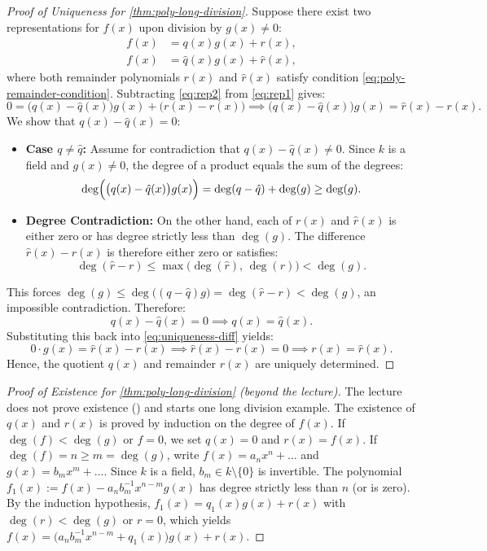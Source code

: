 \begin{content}
\begin{proof}[Proof of Uniqueness for \cref{thm:poly-long-division}]
Suppose there exist two representations for $f(x)$ upon division by $g(x) \neq 0$:
\begin{align}
f(x) &= q(x) g(x) + r(x), \label{eq:rep1} \\
f(x) &= \hat{q}(x) g(x) + \hat{r}(x), \label{eq:rep2}
\end{align}
where both remainder polynomials $r(x)$ and $\hat{r}(x)$ satisfy condition \eqref{eq:poly-remainder-condition}.
Subtracting \eqref{eq:rep2} from \eqref{eq:rep1} gives:
\begin{equation}\label{eq:uniqueness-diff}
0 = \bigl(q(x) - \hat{q}(x)\bigr) g(x) + \bigl(r(x) - \hat{r}(x)\bigr) \implies \bigl(q(x) - \hat{q}(x)\bigr) g(x) = \hat{r}(x) - r(x).
\end{equation}
We show that $q(x) - \hat{q}(x) = 0$:
\begin{itemize}
    \item \textbf{Case $q \neq \hat{q}$:} Assume for contradiction that $q(x) - \hat{q}(x) \neq 0$. Since $k$ is a field and $g(x) \neq 0$, the degree of a product equals the sum of the degrees:
    \[
    \deg\Bigl(\bigl(q(x) - \hat{q}(x)\bigr) g(x)\Bigr) = \deg(q - \hat{q}) + \deg(g) \ge \deg(g).
    \]
    \item \textbf{Degree Contradiction:} On the other hand, each of $r(x)$ and $\hat{r}(x)$ is either zero or has degree strictly less than $\deg(g)$. The difference $\hat{r}(x) - r(x)$ is therefore either zero or satisfies:
    \[
    \deg(\hat{r} - r) \le \max\bigl(\deg(\hat{r}), \, \deg(r)\bigr) < \deg(g).
    \]
\end{itemize}
This forces $\deg(g) \le \deg\bigl((q - \hat{q})g\bigr) = \deg(\hat{r} - r) < \deg(g)$, an impossible contradiction.
Therefore:
\[
q(x) - \hat{q}(x) = 0 \implies q(x) = \hat{q}(x).
\]
Substituting this back into \eqref{eq:uniqueness-diff} yields:
\[
0 \cdot g(x) = \hat{r}(x) - r(x) \implies \hat{r}(x) - r(x) = 0 \implies r(x) = \hat{r}(x).
\]
Hence, the quotient $q(x)$ and remainder $r(x)$ are uniquely determined.
\end{proof}

\begin{proof}[Proof of Existence for \cref{thm:poly-long-division} (beyond the lecture)]
The lecture does not prove existence () and starts one long division example. The existence of $q(x)$ and $r(x)$ is proved by induction on the degree of $f(x)$. If $\deg(f) < \deg(g)$ or $f = 0$, we set $q(x) = 0$ and $r(x) = f(x)$. If $\deg(f) = n \ge m = \deg(g)$, write $f(x) = a_n x^n + \dots$ and $g(x) = b_m x^m + \dots$. Since $k$ is a field, $b_m \in k \setminus \{0\}$ is invertible. The polynomial $f_1(x) := f(x) - a_n b_m^{-1} x^{n-m} g(x)$ has degree strictly less than $n$ (or is zero). By the induction hypothesis, $f_1(x) = q_1(x) g(x) + r(x)$ with $\deg(r) < \deg(g)$ or $r = 0$, which yields $f(x) = \bigl(a_n b_m^{-1} x^{n-m} + q_1(x)\bigr) g(x) + r(x)$.
\end{proof}
\end{content}

